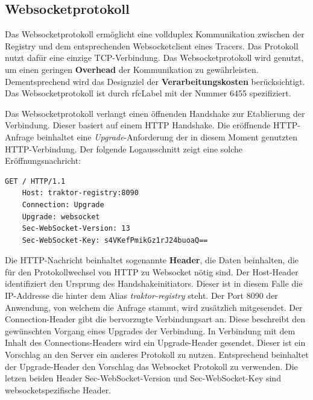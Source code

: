 \subsection{Websocketprotokoll}
\label{subsection:Websocketprotokoll}

Das Websocketprotokoll ermöglicht eine vollduplex Kommunikation zwischen der Registry und dem entsprechenden Websocketclient eines Tracers. Das Protokoll nutzt dafür eine einzige TCP-Verbindung. Das Websocketprotokoll wird genutzt, um einen geringen \textbf{Overhead} der Kommunikation zu gewährleisten. Dementsprechend wird das Designziel der \textbf{Verarbeitungskosten} berücksichtigt. Das Websocketprotokoll ist durch \gls{rfcLabel} mit der Nummer 6455 spezifiziert.

Das Websocketprotokoll verlangt einen öffnenden Handshake zur Etablierung der Verbindung. Dieser basiert auf einem HTTP Handshake. Die eröffnende HTTP-Anfrage beinhaltet eine \emph{Upgrade}-Anforderung der in diesem Moment genutzten HTTP-Verbindung. Der folgende Logausschnitt zeigt eine solche Eröffnungsnachricht:

\begin{minipage}[]{\textwidth}
	\begin{lstlisting}[frame=trBL]
	GET / HTTP/1.1
	Host: traktor-registry:8090
	Connection: Upgrade
	Upgrade: websocket
	Sec-WebSocket-Version: 13
	Sec-WebSocket-Key: s4VKefPmikGz1rJ24buoaQ==
	\end{lstlisting}
	\label{listing:Eröffnender Websocket Handshake}
\end{minipage} 

Die HTTP-Nachricht beinhaltet sogenannte \textbf{Header}, die Daten beinhalten, die für den Protokollwechsel von HTTP zu Websocket nötig sind. Der Host-Header identifiziert den Ursprung des Handshakeinitiators. Dieser ist in diesem Falle die IP-Addresse die hinter dem Alias \emph{traktor-registry} steht. Der Port 8090 der Anwendung, von welchem die Anfrage stammt, wird zusätzlich mitgesendet. Der Connection-Header gibt die bervorzugte Verbindungsart an. Diese beschreibt den gewünschten Vorgang eines Upgrades der Verbindung. In Verbindung mit dem Inhalt des Connections-Headers wird ein Upgrade-Header gesendet. Dieser ist ein Vorschlag an den Server ein anderes Protokoll zu nutzen. Entsprechend beinhaltet der Upgrade-Header den Vorschlag das Websocket Protokoll zu verwenden. Die letzen beiden Header Sec-WebSocket-Version und Sec-WebSocket-Key sind websocketspezifische Header.

